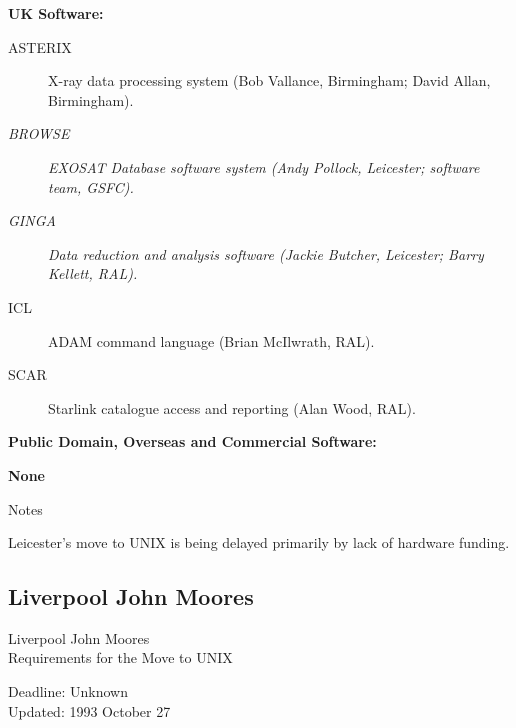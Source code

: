 \begin{center}
{\bf UK Software:}
\end{center}

\begin{description}
\item[ASTERIX] X-ray data processing system (Bob Vallance, Birmingham; 
David Allan, Birmingham).
\item[{\em BROWSE}] {\em EXOSAT Database software system (Andy Pollock, 
Leicester; software team, GSFC).}
\item[{\em GINGA}] {\em Data reduction and analysis software (Jackie 
Butcher, Leicester; Barry Kellett, RAL).}
\item[ICL] ADAM command language (Brian McIlwrath, RAL).
\item[SCAR] Starlink catalogue access and reporting (Alan Wood, RAL).
\end{description}


\vspace{5mm}
\begin{center}
{\bf Public Domain, Overseas and Commercial Software:}
\end{center}

{\bf None}


\vspace{5mm}
\begin{center}
{\large\sc Notes}
\end{center}

Leicester's move to UNIX is being delayed primarily by lack of hardware 
funding.


\newpage
\subsection{Liverpool John Moores}

\renewcommand{\starsitename}{Liverpool John Moores}
\renewcommand{\starnodename}{uk.ac.livjm.star}

\renewcommand{\starunixdate}{Unknown}
\renewcommand{\starupdate}{1993 October 27}

\renewcommand{\starsitetelephone}{051 231 2337}
\renewcommand{\starsitefax}{051 298 1014}

\begin{center}
{\Large\sc \starsitename \\ [2ex]
           Requirements for the Move to UNIX}

\vspace{3mm}
{\large\sc Deadline: \starunixdate \\ [1ex]
           Updated: \starupdate}
\end{center}

